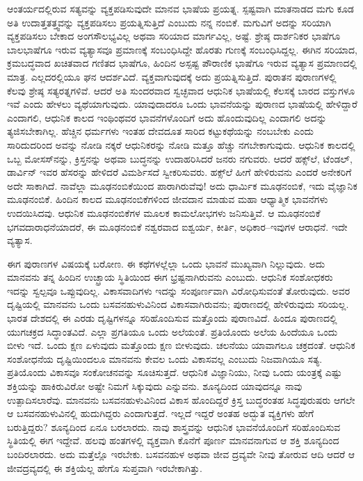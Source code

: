 ಆಂತರ್ಯದಲ್ಲಿರುವ ಸತ್ಯವನ್ನು ವ್ಯಕ್ತಪಡಿಸುವುದೇ ಮಾನವ ಭಾಷೆಯ ಪ್ರಯತ್ನ. ಸ್ಪಷ್ಟವಾಗಿ ಮಾತನಾಡದ ಮಗು ಕೂಡ ಅತಿ ಉದಾತ್ತತತ್ತ್ವವನ್ನು ವ್ಯಕ್ತಪಡಿಸಲು ಪ್ರಯತ್ನಿಸುತ್ತಿದೆ ಎಂಬುದು ನನ್ನ ನಂಬಿಕೆ. ಮಗುವಿಗೆ ಅದನ್ನು ಸರಿಯಾಗಿ ವ್ಯಕ್ತಪಡಿಸಲು ಬೇಕಾದ ಅಂಗಸೌಲಭ್ಯವಿಲ್ಲ ಅಥವಾ ಸರಿಯಾದ ಮಾರ್ಗವಿಲ್ಲ, ಅಷ್ಟೆ. ಶ್ರೇಷ್ಠ ದಾರ್ಶನಿಕರ ಭಾಷೆಗೂ ಬಾಲಭಾಷೆಗೂ ಇರುವ ವ್ಯತ್ಯಾಸವೂ ಪ್ರಮಾಣಕ್ಕೆ ಸಂಬಂಧಿಸಿದ್ದೇ ಹೊರತು ಗುಣಕ್ಕೆ ಸಂಬಂಧಿಸಿದ್ದಲ್ಲ. ಈಗಿನ ಸರಿಯಾದ, ಕ್ರಮಬದ್ಧವಾದ ಖಚಿತವಾದ ಗಣಿತದ ಭಾಷೆಗೂ, ಹಿಂದಿನ ಅಸ್ಪಷ್ಟ ಪೌರಾಣಿಕ ಭಾಷೆಗೂ ಇರುವ ವ್ಯತ್ಯಾಸ ಪ್ರಮಾಣದಲ್ಲಿ ಮಾತ್ರ. ಎಲ್ಲದರಲ್ಲಿಯೂ ಘನ ಆದರ್ಶವಿದೆ. ವ್ಯಕ್ತವಾಗುವುದಕ್ಕೆ ಅದು ಪ್ರಯತ್ನಿಸುತ್ತಿದೆ. ಪುರಾತನ ಪುರಾಣಗಳಲ್ಲಿ ಕೆಲವು ಶ್ರೇಷ್ಠ ಸತ್ಯರತ್ನಗಳಿವೆ. ಆದರೆ ಅತಿ ಸುಂದರವಾದ ಸ್ವಚ್ಛವಾದ ಆಧುನಿಕ ಭಾಷೆಯಲ್ಲಿ ಕೆಲಸಕ್ಕೆ ಬಾರದ ವಸ್ತುಗಳೂ ಇವೆ ಎಂದು ಹೇಳಲು ವ್ಯಥೆಯಾಗುವುದು. ಯಾವುದಾದರೂ ಒಂದು ಭಾವನೆಯನ್ನು ಪುರಾಣದ ಭಾಷೆಯಲ್ಲಿ ಹೇಳಿದ್ದಾರೆ ಎಂದಾಗಲಿ, ಆಧುನಿಕ ಕಾಲದ ಇಂಥಿಂಥವರ ಭಾವನೆಗಳೊಂದಿಗೆ ಅದು ಹೊಂದುವುದಿಲ್ಲ ಎಂದಾಗಲಿ ಅದನ್ನು ತ್ಯಜಿಸಬೇಕಾಗಿಲ್ಲ. ಹೆಚ್ಚಿನ ಧರ್ಮಗಳು ಇಂತಹ ದೇವದೂತ ಸಾರಿದ ಕಟ್ಟುಕಥೆಯನ್ನು ನಂಬಬೇಕು ಎಂದು ಸಾರಿದುದರಿಂದ ಅವನ್ನು ನೋಡಿ ನಕ್ಕರೆ ಆಧುನಿಕರನ್ನು ನೋಡಿ ಮತ್ತೂ ಹೆಚ್ಚು ನಗಬೇಕಾಗುವುದು. ಆಧುನಿಕ ಕಾಲದಲ್ಲಿ ಒಬ್ಬ ಮೋಸಸ್​ನನ್ನು, ಕ್ರಿಸ್ತನನ್ನು ಅಥವಾ ಬುದ್ಧನನ್ನು ಉದಾಹರಿಸಿದರೆ ಜನರು ನಗುವರು. ಆದರೆ ಹಕ್ಸ್​ಲೆ, ಟೆಂಡಲ್​, ಡಾರ್ವಿನ್​ ಇವರ ಹೆಸರನ್ನು ಹೇಳಿದರೆ ವಿಮರ್ಶಿಸದೆ ಸ್ವೀಕರಿಸುವರು. ಹಕ್ಸ್​ಲೆ ಹೀಗೆ ಹೇಳಿರುವನು ಎಂದರೆ ಅನೇಕರಿಗೆ ಅದೇ ಸಾಕಾಗಿದೆ. ನಾವೆಲ್ಲಾ ಮೂಢನಂಬಿಕೆಯಿಂದ ಪಾರಾಗಿರುವೆವು! ಅದು ಧಾರ್ಮಿಕ ಮೂಢನಂಬಿಕೆ, ಇದು ವೈಜ್ಞಾನಿಕ ಮೂಢನಂಬಿಕೆ. ಹಿಂದಿನ ಕಾಲದ ಮೂಢನಂಬಿಕೆಗಳಿಂದ ಜೀವದಾನ ಮಾಡುವ ಮಹಾ ಆಧ್ಯಾತ್ಮಿಕ ಭಾವನೆಗಳು ಉದಯಿಸಿದವು. ಆಧುನಿಕ ಮೂಢನಂಬಿಕೆಗಳ ಮೂಲಕ ಕಾಮಲೋಭಗಳು ಜನಿಸುತ್ತಿವೆ. ಆ ಮೂಢನಂಬಿಕೆ ಭಗವದಾರಾಧನೆಯಾದರೆ, ಈ ಮೂಢನಂಬಿಕೆ ನಶ್ವರವಾದ ಐಶ್ವರ್ಯ, ಕೀರ್ತಿ, ಅಧಿಕಾರ–ಇವುಗಳ ಆರಾಧನೆ. ಇದೇ ವ್ಯತ್ಯಾಸ.

ಈಗ ಪುರಾಣಗಳ ವಿಷಯಕ್ಕೆ ಬರೋಣ. ಈ ಕಥೆಗಳಲ್ಲೆಲ್ಲಾ ಒಂದು ಭಾವನೆ ಮುಖ್ಯವಾಗಿ ನಿಲ್ಲುವುದು. ಅದು ಮಾನವನು ತನ್ನ ಹಿಂದಿನ ಉಚ್ಛ್ರಾಯ ಸ್ಥಿತಿಯಿಂದ ಈಗ ಭ್ರಷ್ಟನಾಗಿರುವನು ಎಂಬುದು. ಆಧುನಿಕ ಸಂಶೋಧಕರು ಇದನ್ನು ಸ್ವಲ್ಪವೂ ಒಪ್ಪುವುದಿಲ್ಲ. ವಿಕಾಸವಾದಿಗಳು ಇದನ್ನು ಸಂಪೂರ್ಣವಾಗಿ ವಿರೋಧಿಸುವಂತೆ ತೋರುವುದು. ಅವರ ದೃಷ್ಟಿಯಲ್ಲಿ ಮಾನವನು ಒಂದು ಬಸವನಹುಳುವಿನಿಂದ ವಿಕಾಸವಾಗಿರುವನು; ಪುರಾಣದಲ್ಲಿ ಹೇಳಿರುವುದು ಸರಿಯಲ್ಲ. ಭಾರತ ದೇಶದಲ್ಲಿ ಈ ಎರಡು ದೃಷ್ಟಿಗಳನ್ನೂ ಸರಿಹೊಂದಿಸುವ ಮತ್ತೊಂದು ಪುರಾಣವಿದೆ. ಹಿಂದೂ ಪುರಾಣದಲ್ಲಿ ಯುಗಚಕ್ರದ ಸಿದ್ಧಾಂತವಿದೆ. ಎಲ್ಲಾ ಪ್ರಗತಿಯೂ ಒಂದು ಅಲೆಯಂತೆ. ಪ್ರತಿಯೊಂದು ಅಲೆಯ ಹಿಂದೆಯೂ ಒಂದು ಬೀಳು ಇದೆ. ಒಂದು ಕ್ಷಣ ಏಳುವುದು ಮತ್ತೊಂದು ಕ್ಷಣ ಬೀಳುವುದು. ಚಲನೆಯು ಯಾವಾಗಲೂ ಚಕ್ರದಂತೆ. ಆಧುನಿಕ ಸಂಶೋಧನೆಯ ದೃಷ್ಟಿಯಿಂದಲೂ ಮಾನವನು ಕೇವಲ ಒಂದು ವಿಕಾಸವಲ್ಲ ಎಂಬುದು ನಿಜವಾಗಿಯೂ ಸತ್ಯ. ಪ್ರತಿಯೊಂದು ವಿಕಾಸವೂ ಸಂಕೋಚನವನ್ನು ಸೂಚಿಸುತ್ತದೆ. ಆಧುನಿಕ ವಿಜ್ಞಾನಿಯು, ನೀವು ಒಂದು ಯಂತ್ರಕ್ಕೆ ಎಷ್ಟು ಶಕ್ತಿಯನ್ನು ಹಾಕಿರುವಿರೋ ಅಷ್ಟೇ ನಿಮಗೆ ಸಿಕ್ಕುವುದು ಎನ್ನುವನು. ಶೂನ್ಯದಿಂದ ಯಾವುದನ್ನೂ ನಾವು ಉತ್ಪಾದಿಸಲಾರೆವು. ಮಾನವನು ಬಸವನಹುಳುವಿನಿಂದ ವಿಕಾಸ ಹೊಂದಿದ್ದರೆ ಕ್ರಿಸ್ತ ಬುದ್ಧರಂತಹ ಸಿದ್ಧಪುರುಷರು ಆಗಲೇ ಆ ಬಸವನಹುಳುವಿನಲ್ಲಿ ಹುದುಗಿದ್ದರು ಎಂದಾಗುತ್ತದೆ. ಇಲ್ಲದೆ ಇದ್ದರೆ ಅಂತಹ ಅದ್ಭುತ ವ್ಯಕ್ತಿಗಳು ಹೇಗೆ ಬರುತ್ತಿದ್ದರು? ಶೂನ್ಯದಿಂದ ಏನೂ ಬರಲಾರದು. ನಾವು ಶಾಸ್ತ್ರವನ್ನು ಆಧುನಿಕ ಭಾವನೆಯೊಂದಿಗೆ ಸರಿಹೊಂದಿಸುವ ಸ್ಥಿತಿಯಲ್ಲಿ ಈಗ ಇದ್ದೇವೆ. ಹಲವು ಹಂತಗಳಲ್ಲಿ ವ್ಯಕ್ತವಾಗಿ ಕೊನೆಗೆ ಪೂರ್ಣ ಮಾನವನಾಗುವ ಆ ಶಕ್ತಿ ಶೂನ್ಯದಿಂದ ಬಂದಿರಲಾರದು. ಅದು ಮತ್ತೆಲ್ಲೊ ಇರಬೇಕು. ಬಸವನಹುಳ ಅಥವಾ ಜೀವ ದ್ರವ್ಯವೇ ನೀವು ತೋರುವ ಆದಿ ಆದರೆ ಆ ಜೀವದ್ರವ್ಯದಲ್ಲಿ ಈ ಶಕ್ತಿಯೆಲ್ಲ ಹೇಗೊ ಸುಪ್ತವಾಗಿ ಇರಬೇಕಾಗಿತ್ತು.

